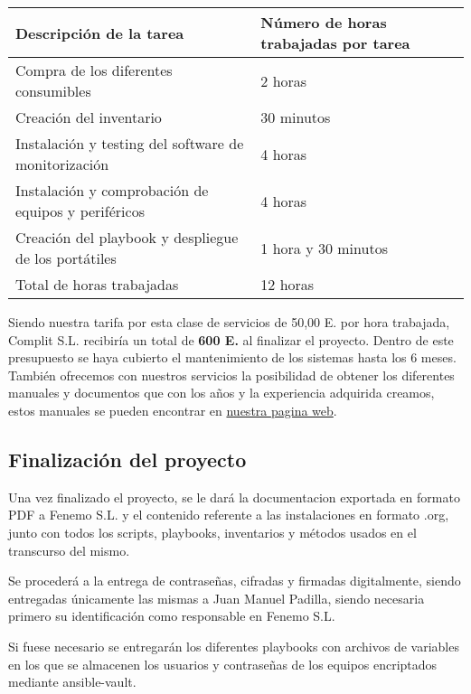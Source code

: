 \documentclass[11pt]{article}
\begin{document}
\begin{adjustbox}{width={\textwidth},keepaspectratio}
\centering
\begin{center}
\begin{tabular}{ll}
Descripción de la tarea & Número de horas trabajadas por tarea\\
\hline
Compra de los diferentes consumibles & 2 horas\\
Creación del inventario & 30 minutos\\
Instalación y testing del software de monitorización & 4 horas\\
Instalación y comprobación de equipos y periféricos & 4 horas\\
Creación del playbook y despliegue de los portátiles & 1 hora y 30 minutos\\
\hline
Total de horas trabajadas & 12 horas\\
\end{tabular}
\end{center}
\end{adjustbox}

Siendo nuestra tarifa por esta clase de servicios de 50,00 E. por hora trabajada, Complit S.L. recibiría un total de \textbf{600 E.} al finalizar el proyecto. Dentro de este presupuesto se haya cubierto el mantenimiento de los sistemas hasta los 6 meses. También ofrecemos con nuestros servicios la posibilidad de obtener los diferentes manuales y documentos que con los años y la experiencia adquirida creamos, estos manuales se pueden encontrar en \href{https:www.complitdocu.it}{nuestra pagina web}.

\subsection{Finalización del proyecto}
\label{sec:org0adc8bb}

Una vez finalizado el proyecto, se le dará la documentacion exportada en formato PDF a Fenemo S.L. y el contenido referente a las instalaciones en formato .org, junto con todos los scripts, playbooks, inventarios y métodos usados en el transcurso del mismo.

Se procederá a la entrega de contraseñas, cifradas y firmadas digitalmente, siendo entregadas únicamente las mismas a Juan Manuel Padilla, siendo necesaria primero su identificación como responsable en Fenemo S.L.

Si fuese necesario se entregarán los diferentes playbooks con archivos de variables en los que se almacenen los usuarios y contraseñas de los equipos encriptados mediante ansible-vault.
\end{document}
